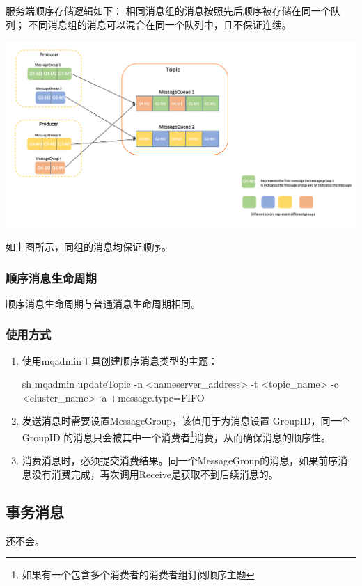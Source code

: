 \documentclass[11pt, a4paper, oneside, fontset=none]{ctexbook}
\begin{document}
服务端顺序存储逻辑如下：
相同消息组的消息按照先后顺序被存储在同一个队列；
不同消息组的消息可以混合在同一个队列中，且不保证连续。
\begin{center}
  \begin{minipage}{\textwidth}
    \center
    \includegraphics[width=\textwidth]{picture/服务端顺序存储逻辑.png}
    \captionsetup{hypcap=false}
    \label{fig:服务端顺序存储逻辑}
  \end{minipage}
\end{center}
如上图所示，同组的消息均保证顺序。

\subsubsection{顺序消息生命周期}
顺序消息生命周期与普通消息生命周期相同。

\subsubsection{使用方式}
\begin{enumerate}
  \item 使用mqadmin工具创建顺序消息类型的主题：
  \begin{bash}
    sh mqadmin updateTopic -n <nameserver_address> -t <topic_name> -c <cluster_name> -a +message.type=FIFO
  \end{bash}
  \item 发送消息时需要设置MessageGroup，该值用于为消息设置 GroupID，同一个 GroupID 的消息只会被其中一个消费者\footnote{如果有一个包含多个消费者的消费者组订阅顺序主题}消费，从而确保消息的顺序性。
  \item 消费消息时，必须提交消费结果。同一个MessageGroup的消息，如果前序消息没有消费完成，再次调用Receive是获取不到后续消息的。
\end{enumerate}

\subsection{事务消息}
还不会。
\end{document}
